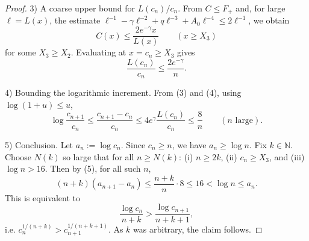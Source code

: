 \begin{proof}
3) A coarse upper bound for $L(c_n)/c_n$. From $C\le F_+$ and, for large $\ell=L(x)$, the estimate $\ell^{-1}-\gamma\ell^{-2}+q\ell^{-3}+A_0\ell^{-4}\le 2\ell^{-1}$, we obtain
$$
C(x)\le \frac{2e^{-\gamma}x}{L(x)}\qquad(x\ge X_3)
$$
for some $X_3\ge X_2$. Evaluating at $x=c_n\ge X_3$ gives
$$
\frac{L(c_n)}{c_n}\le \frac{2e^{-\gamma}}{n}.\tag{4}
$$

4) Bounding the logarithmic increment. From (3) and (4), using $\log(1+u)\le u$,
$$
\log\frac{c_{n+1}}{c_n}\le \frac{c_{n+1}-c_n}{c_n}\le 4e^{\gamma}\frac{L(c_n)}{c_n}\le \frac{8}{n}\qquad(n\text{ large}).\tag{5}
$$

5) Conclusion. Let $a_n:=\log c_n$. Since $c_n\ge n$, we have $a_n\ge\log n$. Fix $k\in\mathbb N$. Choose $N(k)$ so large that for all $n\ge N(k)$: (i) $n\ge2k$, (ii) $c_n\ge X_3$, and (iii) $\log n>16$. Then by (5), for all such $n$,
$$
(n+k)(a_{n+1}-a_n)\le \frac{n+k}{n}\cdot 8\le 16<\log n\le a_n.
$$
This is equivalent to
$$
\frac{\log c_n}{n+k}>\frac{\log c_{n+1}}{n+k+1},
$$
i.e. $c_n^{1/(n+k)}>c_{n+1}^{1/(n+k+1)}$. As $k$ was arbitrary, the claim follows. 
\end{proof}
